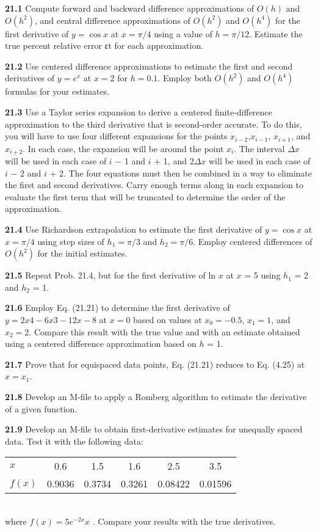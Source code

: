 \documentclass[../main.tex]{subfiles}
\begin{document}
\begin{multicols}{2}
\textbf{21.1} Compute forward and backward difference approximations of $O(h)$ and $O(h^{2})$, and central difference approximations of $O(h^{2})$ and $O(h^{4})$ for the first derivative of
$y = \cos x$ at $x = \pi/4$ using a value of $h = \pi/12$. Estimate
the true percent relative error εt for each approximation. 

\textbf{21.2} Use centered difference approximations to estimate the
first and second derivatives of $y = e^{x}$ at $x = 2$ for $h = 0.1$.
Employ both $O(h^{2})$ and $O(h^{4})$ formulas for your estimates.

\textbf{21.3} Use a Taylor series expansion to derive a centered
finite-difference approximation to the third derivative that is
second-order accurate. To do this, you will have to use four
different expansions for the points $x_{i-2}$,$x_{i-1}$, $x_{i+1}$, and $x_{i+2}$. In each case, the expansion will be around the point $x_{i}$.  The
interval $\Delta x$ will be used in each case of $i$ − 1 and $i$ + 1, and $2\Delta x$ will be used in each case of $i$ − 2 and $i$ + 2. The four
equations must then be combined in a way to eliminate the
first and second derivatives. Carry enough terms along in
each expansion to evaluate the first term that will be truncated to determine the order of the approximation. 

\textbf{21.4} Use Richardson extrapolation to estimate the first derivative of $y = \cos x$ at $x = \pi/4$ using step sizes of $h_{1} = \pi/3$ and $h_{2} = \pi/6$. Employ centered differences of $O(h^{2})$ for the
initial estimates.

\textbf{21.5} Repeat Prob. 21.4, but for the first derivative of ln $x$ at
$x$ = 5 using $h_{1}$ = 2 and $h_{2}$ = 1.

\textbf{21.6} Employ Eq. (21.21) to determine the first derivative 
of $y = 2x4 − 6x3 − 12x − 8$ at $x = 0$ based on values at $x_{0} = - 0.5$, $x_{1} = 1$, and $x_{2} = 2$. Compare this result with
the true value and with an estimate obtained using a centered
difference approximation based on $h$ = 1.

\textbf{21.7} Prove that for equispaced data points, Eq. (21.21)
reduces to Eq. (4.25) at $x = x_{1}$.

\textbf{21.8} Develop an M-file to apply a Romberg algorithm to
estimate the derivative of a given function.

\textbf{21.9} Develop an M-file to obtain first-derivative estimates
for unequally spaced data. Test it with the following data: \\
\begin{tabular}{lccccc}
	\hline
{\textbf{$x$}} & {0.6} & {1.5} & {1.6} & {2.5} & {3.5}\\
{\textbf{$f(x)$}} & {0.9036} & {0.3734} & {0.3261} & {0.08422} & {0.01596}\\ \hline
\end{tabular} \vspace{0.1in} \\
where $f (x) = 5e^{−2x} x$ . Compare your results with the true
derivatives.


\end{multicols}
\end{document}
